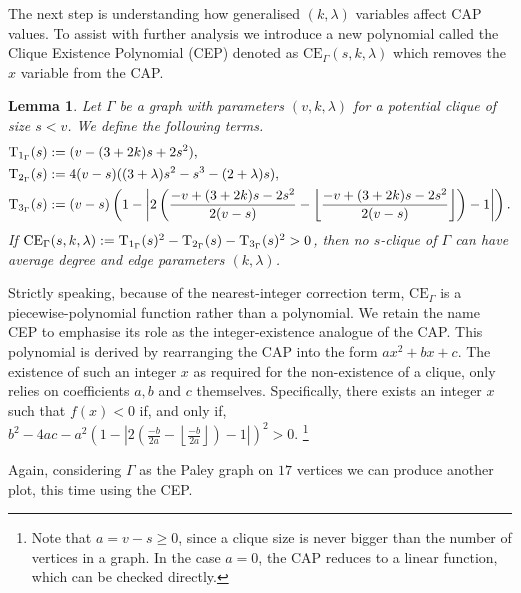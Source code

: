 \documentclass[11pt, baustms]{amsproc}
\theoremstyle{scplain}
\newtheorem{lemma}[theorem]{Lemma}
\newcommand\CE{\mathrm{CE}}
\renewcommand\ge{\geqslant}
\begin{document}
    The next step is understanding how generalised $(k, \lambda)$ variables affect CAP values. To assist with further analysis we introduce a new polynomial called the Clique Existence Polynomial (CEP) denoted as $\CE_\Gamma(s,k,\lambda)$ which removes the $x$ variable from the CAP.
    
    \begin{lemma}
\label{rearrange}
	Let $\Gamma$ be a graph with parameters $(v,k,\lambda)$ for a potential clique of size $s<v$. We define the following terms.
    \begin{align*} 
    \textnormal{T}_{1_\Gamma}(s) &:= (v - (3 + 2k)s + 2s^2), \\ 
	\textnormal{T}_{2_\Gamma}(s) &:= 4(v - s)((3 + \lambda)s^2 - s^3 - (2 + \lambda)s),	\\
	\textnormal{T}_{3_\Gamma}(s) &:= \left(v - s\right)\left(1 - \left|2\left(\frac{-v + (3 + 2k)s - 2s^2}{2(v - s)}- \left\lfloor \frac{-v + (3 + 2k)s - 2s^2}{2(v - s)} \right\rfloor \right) -1 \right| \right).
    \end{align*}
If $\CE_\Gamma(s,k,\lambda) := \textnormal{T}_{1_\Gamma}(s)^2 - \textnormal{T}_{2_\Gamma}(s) - \textnormal{T}_{3_\Gamma}(s)^2 >0$, then no $s$-clique of $\Gamma$ can have average degree and edge parameters $(k,\lambda)$.
	\end{lemma}

Strictly speaking, because of the nearest-integer correction term, $\CE_\Gamma$ is a piecewise-polynomial function rather than a polynomial. We retain the name CEP to emphasise its role as the integer-existence analogue of the CAP.
This polynomial is derived by rearranging the CAP into the form $a x^2 +bx+c$. The existence of such an integer $x$ as required for the non-existence of a clique, only relies on coefficients $a,b$ and $c$ themselves. Specifically, there exists an integer $x$ such that $f(x)<0$ if, and only if, $b^2-4ac-a^2\left(1-\left|2\left(\frac{-b}{2a}- \left\lfloor \frac{-b}{2a} \right\rfloor\right)-1\right|\right)^2 > 0.$ \footnote{Note that $a = v-s \ge 0$, since a clique size is never bigger than the number of vertices in a graph. 
In the case $a=0$, the CAP reduces to a linear function, which can be checked directly.}

    Again, considering $\Gamma$ as the Paley graph on $17$ vertices we can produce another plot, this time using the CEP.
    
\end{document}
